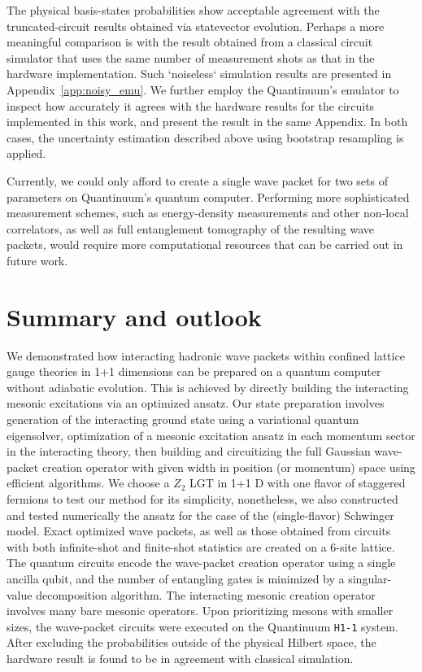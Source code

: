 \documentclass[a4paper,onecolumn,11pt,accepted=2024-10-11]{quantumarticle}
\begin{document}
The physical basis-states probabilities show acceptable agreement with the truncated-circuit results obtained via statevector evolution. Perhaps a more meaningful comparison is with the result obtained from a classical circuit simulator that uses the same number of measurement shots as that in the hardware implementation. Such `noiseless` simulation results are presented in Appendix~\ref{app:noisy_emu}. We further employ the Quantinuum's emulator to inspect how accurately it agrees with the hardware results for the circuits implemented in this work, and present the result in the same Appendix. In both cases, the uncertainty estimation described above using bootstrap resampling is applied.

Currently, we could only afford to create a single wave packet for two sets of parameters on Quantinuum's quantum computer. Performing more sophisticated measurement schemes, such as energy-density measurements and other non-local correlators, as well as full entanglement tomography of the resulting wave packets, would require more computational resources that can be carried out in future work.

\section{Summary and outlook}
\label{sec:summary}
\noindent
We demonstrated how interacting hadronic wave packets within confined lattice gauge theories in 1+1 dimensions can be prepared on a quantum computer without adiabatic evolution. This is achieved by directly building the interacting mesonic excitations via an optimized ansatz. Our state preparation involves generation of the interacting ground state using a variational quantum eigensolver, optimization of a mesonic excitation ansatz in each momentum sector in the interacting theory, then building and circuitizing the full Gaussian wave-packet creation operator with given width in position (or momentum) space using efficient algorithms. We choose a $Z_2$ LGT in 1+1 D with one flavor of staggered fermions to test our method for its simplicity, nonetheless, we also constructed and tested numerically the ansatz for the case of the (single-flavor) Schwinger model. Exact optimized wave packets, as well as those obtained from circuits with both infinite-shot and finite-shot statistics are created on a 6-site lattice. The quantum circuits encode the wave-packet creation operator using a single ancilla qubit, and the number of entangling gates is minimized by a singular-value decomposition algorithm. The interacting mesonic creation operator involves many bare mesonic operators. Upon prioritizing mesons with smaller sizes, the wave-packet circuits were executed on the Quantinuum \texttt{H1-1} system. After excluding the probabilities outside of the physical Hilbert space, the hardware result is found to be in agreement with classical simulation.
\end{document}
